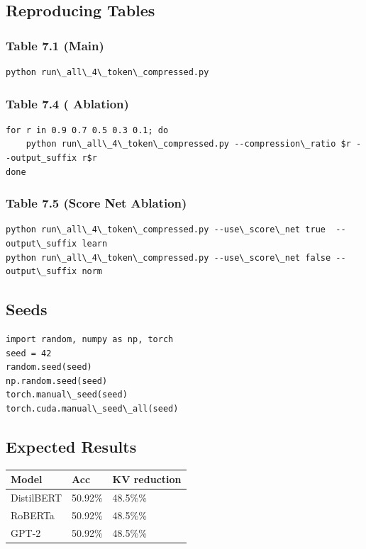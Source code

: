 \subsection{Reproducing Tables}

\subsubsection{Table 7.1 (Main)}
\begin{lstlisting}
python run\_all\_4\_token\_compressed.py
\end{lstlisting}

\subsubsection{Table 7.4 (  Ablation)}
\begin{lstlisting}
for r in 0.9 0.7 0.5 0.3 0.1; do
    python run\_all\_4\_token\_compressed.py --compression\_ratio $r --output_suffix r$r
done
\end{lstlisting}

\subsubsection{Table 7.5 (Score Net Ablation)}
\begin{lstlisting}
python run\_all\_4\_token\_compressed.py --use\_score\_net true  --output\_suffix learn
python run\_all\_4\_token\_compressed.py --use\_score\_net false --output\_suffix norm
\end{lstlisting}

\subsection{Seeds}

\begin{lstlisting}
import random, numpy as np, torch
seed = 42
random.seed(seed)
np.random.seed(seed)
torch.manual\_seed(seed)
torch.cuda.manual\_seed\_all(seed)
\end{lstlisting}

\subsection{Expected Results}

\begin{table}[H]
\centering
\small
\begin{tabular}{lll}
\toprule
\textbf{Model} & \textbf{Acc} & \textbf{KV reduction} \\
\midrule
DistilBERT & 50.92\% & 48.5\%\% \\
RoBERTa & 50.92\% & 48.5\%\% \\
GPT-2 & 50.92\% & 48.5\%\% \\
\bottomrule
\end{tabular}
\end{table}

